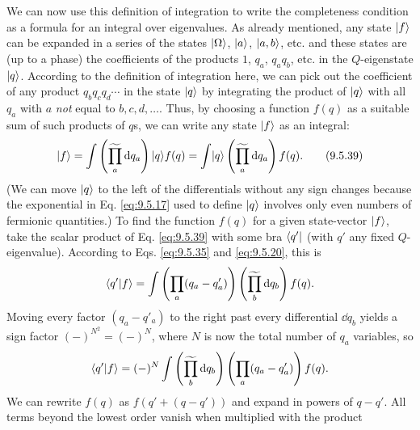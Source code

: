 We can now use this definition of integration to write the completeness
condition as a formula for an integral over eigenvalues. As already mentioned,
any state $\lvert f\rangle$ can be expanded in a series of the states $\lvert \Omega\rangle$,
$\lvert a\rangle$, $\lvert a,b\rangle$, etc. and these states are (up to a phase) the
coefficients of the products $1$, $q_a$, $q_aq_b$, etc. in the $Q$-eigenstate
$\lvert q\rangle$. According to the definition of integration here, we can pick out
the coefficient of any product $q_bq_cq_d\cdots$ in the state $\lvert q\rangle$ by
integrating the product of $\lvert q\rangle$ with all $q_a$ with $a$ \emph{not} equal
to $b,c,d,\ldots$. Thus, by choosing a function $f(q)$ as a suitable sum of
such products of $q$s, we can write any state $\lvert f\rangle$ as an integral:
\begin{equation}
\lvert f\rangle=\int\left(\widetilde{\prod_a}\mathop{}\!\mathrm{d} q_a\right)\lvert q\rangle f(q)
=\int\lvert q\rangle\left(\widetilde{\prod_a}\mathop{}\!\mathrm{d} q_a\right)f(q).
\tag{9.5.39}\label{eq:9.5.39}
\end{equation}
(We can move $\lvert q\rangle$ to the left of the differentials without any sign
changes because the exponential in Eq. \eqref{eq:9.5.17} used to define $\lvert q\rangle$
involves only even numbers of fermionic quantities.) To find the function
$f(q)$ for a given state-vector $\lvert f\rangle$, take the scalar product of Eq.
\eqref{eq:9.5.39} with some bra $\langle q'\rvert$ (with $q'$ any fixed $Q$-eigenvalue).
According to Eqs. \eqref{eq:9.5.35} and \eqref{eq:9.5.20}, this is
\[
\langle q' | f\rangle=\int\left(\prod_a(q_a-q'_a)\right)
 \left(\widetilde{\prod_b}\mathop{}\!\mathrm{d} q_b\right)f(q).
\]
Moving every factor $(q_a-q'_a)$ to the right past every differential $\dd q_b$
yields a sign factor $(-)^{N^2}=(-)^N$, where $N$ is now the total number of
$q_a$ variables, so
\[
\langle q' | f\rangle=(-)^N\int\left(\widetilde{\prod_b}\mathop{}\!\mathrm{d} q_b\right)
 \left(\prod_a(q_a-q'_a)\right)f(q).
\]
We can rewrite $f(q)$ as $f(q'+(q-q'))$ and expand in powers of $q-q'$. All
terms beyond the lowest order vanish when multiplied with the product
